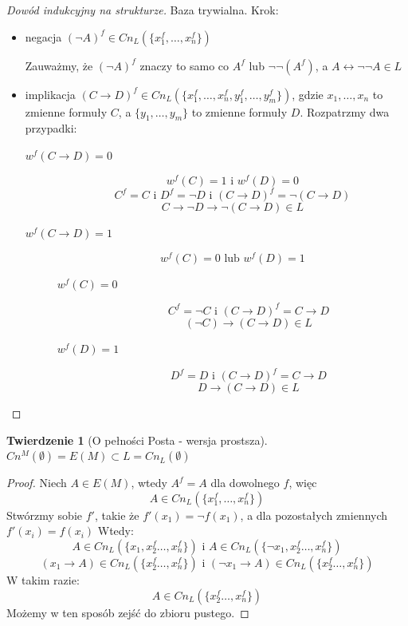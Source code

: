 \documentclass[10pt,a4paper]{article}
\theoremstyle{plain}
\newtheorem{theorem}{Twierdzenie}
\theoremstyle{definition}
\newcommand{\impl}{\rightarrow}
\begin{document}
\begin{proof}[Dowód indukcyjny na strukturze]
Baza trywialna.
Krok:
\begin{itemize}
\item negacja $(\neg A)^f \in Cn_L(\{x_1^f, \dots, x_n^f\})$

	Zauważmy, że $(\neg A)^f$ znaczy to samo co $A^f$ lub $\neg\neg(A^f)$,
	a $A \leftrightarrow \neg\neg A \in L$
\item implikacja
	$(C \impl D)^f \in Cn_L(\{x_1^f, \dots, x_n^f, y_1^f, \dots, y_m^f\})$,
	gdzie $x_1, \dots, x_n$ to zmienne formuły $C$,
	a $\{y_1, \dots, y_m\}$ to zmienne formuły $D$.
	Rozpatrzmy dwa przypadki:
	\begin{description}
		\item[$w^f(C\impl D) = 0$]
			$$w^f(C) = 1\text{ i }w^f(D) = 0$$
			$$C^f = C\text{ i }D^f = \neg D\text{ i }(C \impl D)^f = \neg(C \impl D)$$
			$$C \impl \neg D \impl \neg(C \impl D) \in L$$
		\item[$w^f(C\impl D) = 1$]
			$$w^f(C) = 0 \text { lub } w^f(D) = 1$$
			\begin{description}
				\item[$w^f(C) = 0$]
					$$C^f = \neg C\text{ i }(C \impl D)^f = C \impl D$$
					$$(\neg C) \impl (C \impl D) \in L$$
				\item[$w^f(D) = 1$]
					$$D^f = D\text{ i }(C \impl D)^f = C \impl D$$
					$$D \impl (C \impl D) \in L$$
			\end{description}
	\end{description}
\end{itemize}
\end{proof}

\begin{theorem}[O pełności Posta - wersja prostsza]
$Cn^M(\emptyset) = E(M) \subset L = Cn_L(\emptyset)$
\end{theorem}

\begin{proof}
Niech $A \in E(M)$, wtedy $A^f = A$ dla dowolnego $f$, więc
$$A \in Cn_L(\{x_1^f, \dots, x_n^f\})$$
Stwórzmy sobie $f'$, takie że $f'(x_1) = \neg f(x_1)$,
a dla pozostałych zmiennych $f'(x_i) = f(x_i)$
Wtedy:
$$A \in Cn_L(\{x_1, x_2^f\dots, x_n^f\})\text{ i }
A \in Cn_L(\{\neg x_1, x_2^f\dots, x_n^f\})$$
$$(x_1 \impl A) \in Cn_L(\{x_2^f\dots, x_n^f\})\text{ i }
(\neg x_1 \impl A) \in Cn_L(\{x_2^f\dots, x_n^f\})$$
W takim razie:
$$A \in Cn_L(\{x_2^f\dots, x_n^f\})$$
Możemy w ten sposób zejść do zbioru pustego.

\end{proof}
\end{document}
